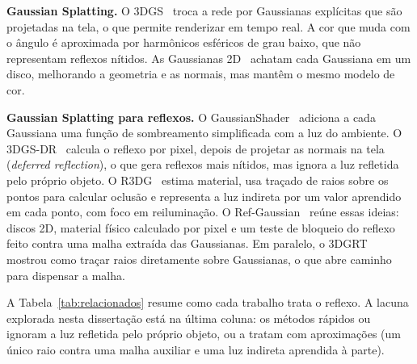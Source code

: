 \documentclass[conference]{IEEEtran}
\begin{document}
\textbf{Gaussian Splatting.} O 3DGS~\cite{kerbl2023} troca a rede por Gaussianas explícitas que são projetadas na tela, o que permite renderizar em tempo real. A cor que muda com o ângulo é aproximada por harmônicos esféricos de grau baixo, que não representam reflexos nítidos. As Gaussianas 2D~\cite{huang2024_2dgs} achatam cada Gaussiana em um disco, melhorando a geometria e as normais, mas mantêm o mesmo modelo de cor.

\textbf{Gaussian Splatting para reflexos.} O GaussianShader~\cite{jiang2024gshader} adiciona a cada Gaussiana uma função de sombreamento simplificada com a luz do ambiente. O 3DGS-DR~\cite{ye2024dr} calcula o reflexo por pixel, depois de projetar as normais na tela (\emph{deferred reflection}), o que gera reflexos mais nítidos, mas ignora a luz refletida pelo próprio objeto. O R3DG~\cite{gao2024r3dg} estima material, usa traçado de raios sobre os pontos para calcular oclusão e representa a luz indireta por um valor aprendido em cada ponto, com foco em reiluminação. O Ref-Gaussian~\cite{yao2025refgaussian} reúne essas ideias: discos 2D, material físico calculado por pixel e um teste de bloqueio do reflexo feito contra uma malha extraída das Gaussianas. Em paralelo, o 3DGRT~\cite{moenne2024_3dgrt} mostrou como traçar raios diretamente sobre Gaussianas, o que abre caminho para dispensar a malha.

A Tabela~\ref{tab:relacionados} resume como cada trabalho trata o reflexo. A lacuna explorada nesta dissertação está na última coluna: os métodos rápidos ou ignoram a luz refletida pelo próprio objeto, ou a tratam com aproximações (um único raio contra uma malha auxiliar e uma luz indireta aprendida à parte).

\begin{table}[t]
\centering
\caption{Resumo dos trabalhos relacionados: representação, modelo de reflexo e tratamento da luz refletida pelo próprio objeto (inter-reflexão).}
\label{tab:relacionados}
\setlength{\tabcolsep}{3pt}
\end{table}
\end{document}
